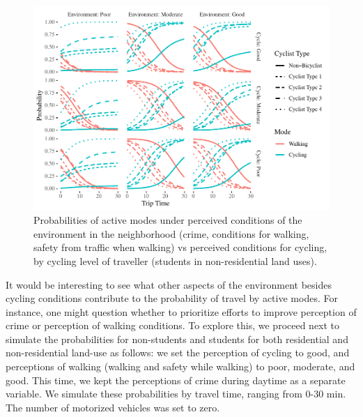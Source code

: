 \documentclass[]{elsarticle} %
\makeatletter
\def\maxwidth{\ifdim\Gin@nat@width>\linewidth\linewidth
\else\Gin@nat@width\fi}
\let\Oldincludegraphics\includegraphics
\renewcommand{\includegraphics}[1]{\Oldincludegraphics[width=\maxwidth]{#1}}
\makeatother
\begin{document}
\begin{figure}
\centering
\includegraphics{Active-Travel-in-Bangladesh_files/figure-latex/figure-probabilities-perceptions-active-student-non-residential-1.pdf}
\caption{\label{fig:probabilities-perceptions-active-student-non-residential}Probabilities
of active modes under perceived conditions of the environment in the
neighborhood (crime, conditions for walking, safety from traffic when
walking) vs perceived conditions for cycling, by cycling level of
traveller (students in non-residential land uses).}
\end{figure}

It would be interesting to see what other aspects of the environment
besides cycling conditions contribute to the probability of travel by
active modes. For instance, one might question whether to prioritize
efforts to improve perception of crime or perception of walking
conditions. To explore this, we proceed next to simulate the
probabilities for non-students and students for both residential and
non-residential land-use as follows: we set the perception of cycling to
good, and perceptions of walking (walking and safety while walking) to
poor, moderate, and good. This time, we kept the perceptions of crime
during daytime as a separate variable. We simulate these probabilities
by travel time, ranging from 0-30 min. The number of motorized vehicles
was set to zero.
\end{document}
